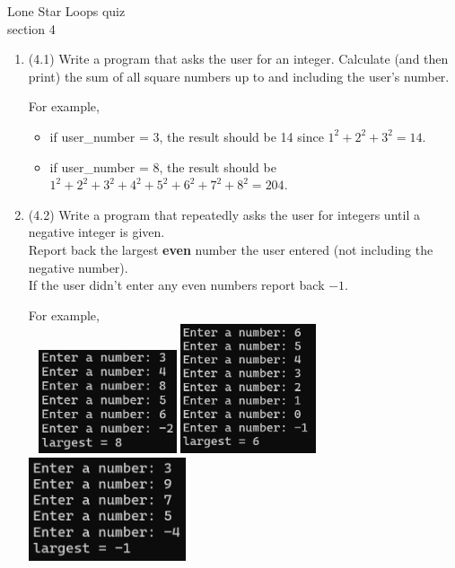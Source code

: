 \documentclass{article}
\begin{document}

Lone Star \hfill Loops quiz\\
section 4\\
\begin{enumerate}
\item (4.1)  
		Write a program that asks the user for an integer.  Calculate (and then print) the 
		sum of all square numbers up to and including the user's number.

		For example, 
		\begin{itemize}
			\item if user\_number = 3, the result should be 14 since $1^2 + 2^2 + 3^2 = 14$.
			\item if user\_number = 8, the result should be $1^2+2^2+3^2+4^2+5^2+6^2+7^2+8^2=204$.
		\end{itemize}


\item (4.2)  
		Write a program that repeatedly asks the user for integers until a negative integer is 
		given.\\  Report back the largest \textbf{even} number the user entered 
		(not including the negative number).  \\
		If the user didn't enter any even numbers report back $-1$.

		For example, \\ \ \hfill
		\includegraphics[height = 1.2in]{./imgs/largestEven1.PNG} \hfill  
		\includegraphics[height = 1.5in]{./imgs/largestEven2.PNG} \hfill  
		\includegraphics[height = 1.2in]{./imgs/largestEven3.PNG} \hfill \


\end{enumerate}
\end{document}
